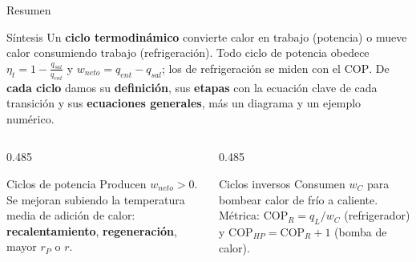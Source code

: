 \documentclass[aspectratio=169,10pt]{beamer}
\begin{document}
\begin{frame}{Resumen}
\begin{cardidea}{Síntesis}{\faLightbulb}
Un \textbf{ciclo termodinámico} convierte calor en trabajo (potencia) o mueve calor consumiendo trabajo (refrigeración). Todo ciclo de potencia obedece $\eta_t = 1-\frac{q_{sal}}{q_{ent}}$ y $w_{neto}=q_{ent}-q_{sal}$; los de refrigeración se miden con el $\mathrm{COP}$. De \textbf{cada ciclo} damos su \textbf{definición}, sus \textbf{etapas} con la ecuación clave de cada transición y sus \textbf{ecuaciones generales}, más un diagrama y un ejemplo numérico.
\end{cardidea}
\vspace{2mm}
\begin{columns}[T]
\begin{column}{0.485\textwidth}
\begin{cardgear}{Ciclos de potencia}{\faFire}
Producen $w_{neto}>0$. Se mejoran subiendo la temperatura media de adición de calor: \textbf{recalentamiento}, \textbf{regeneración}, mayor $r_P$ o $r$.
\end{cardgear}
\end{column}
\begin{column}{0.485\textwidth}
\begin{cardgear}{Ciclos inversos}{\faSnowflake}
Consumen $w_C$ para bombear calor de frío a caliente. Métrica: $\mathrm{COP}_R=q_L/w_C$ (refrigerador) y $\mathrm{COP}_{HP}=\mathrm{COP}_R+1$ (bomba de calor).
\end{cardgear}
\end{column}
\end{columns}
\end{frame}
\end{document}
